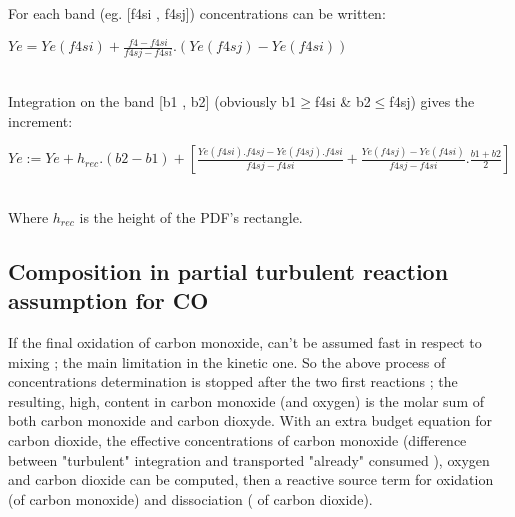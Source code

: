 For each band (eg. [f4si , f4sj]) concentrations can be written:\\
\centerline{$Ye = Ye(f4si) + \frac{f4-f4si}{f4sj-f4si} . \left( Ye(f4sj)-Ye(f4si) \right) $}\\ 
Integration on the band [b1 , b2] ({\small obviously b1$\geq$f4si \&
b2$\leq$f4sj}) gives the increment:\\
\centerline{$Ye:= Ye + h_{rec}.(b2-b1) + \left[ \frac{Ye(f4si).f4sj-Ye(f4sj).f4si}{f4sj-f4si}+\frac{Ye(f4sj)-Ye(f4si)}{f4sj-f4si}.\frac{b1+b2}{2} \right] $}\\
Where $h_{rec}$ is the height of the PDF's rectangle. 

 
 

\subsection{Composition in partial turbulent reaction assumption for CO}

If the final oxidation of carbon monoxide, can't be assumed fast in
respect to mixing ; the main limitation in the kinetic one. So the
above process of concentrations determination is stopped after the two
first reactions ; the resulting, high, content in carbon monoxide
({\small and oxygen}) is the molar sum of both carbon monoxide and
carbon dioxyde. With an extra budget equation for carbon dioxide, the
effective concentrations of carbon monoxide ({\small difference
between "turbulent" integration and transported "already" consumed }),
oxygen and carbon dioxide can be computed, then a reactive source term
for oxidation ({\small of carbon monoxide}) and dissociation ({\small
of carbon dioxide}).

\newpage




